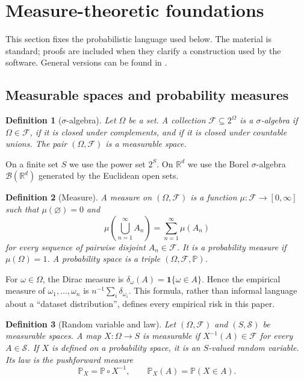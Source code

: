 \documentclass[11pt]{article}
\newtheorem{definition}{Definition}[section]
\newcommand{\R}{\mathbb R}
\newcommand{\1}{\mathbf 1}
\begin{document}
\section{Measure-theoretic foundations}
\label{sec:measure}

This section fixes the probabilistic language used below. The material is
standard; proofs are included when they clarify a construction used by the
software. General versions can be found in
\cite{petersen-zech-2026-mathematical}.

\subsection{Measurable spaces and probability measures}

\begin{definition}[$\sigma$-algebra]
Let $\Omega$ be a set. A collection $\mathcal F\subseteq2^\Omega$ is a
$\sigma$-algebra if $\Omega\in\mathcal F$, if it is closed under complements,
and if it is closed under countable unions. The pair $(\Omega,\mathcal F)$ is a
measurable space.
\end{definition}

On a finite set $S$ we use the power set $2^S$. On $\R^d$ we use the Borel
$\sigma$-algebra $\mathcal B(\R^d)$ generated by the Euclidean open sets.

\begin{definition}[Measure]
A measure on $(\Omega,\mathcal F)$ is a function
$\mu:\mathcal F\to[0,\infty]$ such that $\mu(\varnothing)=0$ and
\[
 \mu\left(\bigcup_{n=1}^{\infty}A_n\right)
 =\sum_{n=1}^{\infty}\mu(A_n)
\]
for every sequence of pairwise disjoint $A_n\in\mathcal F$. It is a
probability measure if $\mu(\Omega)=1$. A probability space is a triple
$(\Omega,\mathcal F,\mathbb P)$.
\end{definition}

For $\omega\in\Omega$, the Dirac measure is
$\delta_\omega(A)=\1\{\omega\in A\}$. Hence the empirical measure of
$\omega_1,\ldots,\omega_n$ is $n^{-1}\sum_i\delta_{\omega_i}$. This formula,
rather than informal language about a ``dataset distribution'', defines every
empirical risk in this paper.

\begin{definition}[Random variable and law]
Let $(\Omega,\mathcal F)$ and $(S,\mathcal S)$ be measurable spaces. A map
$X:\Omega\to S$ is measurable if $X^{-1}(A)\in\mathcal F$ for every
$A\in\mathcal S$. If $X$ is defined on a probability space, it is an
$S$-valued random variable. Its law is the pushforward measure
\[
 \mathbb P_X=\mathbb P\circ X^{-1},
 \qquad \mathbb P_X(A)=\mathbb P(X\in A).
\]
\end{definition}
\end{document}

